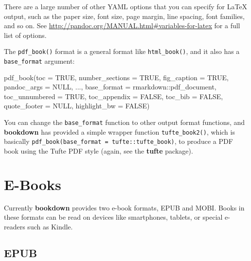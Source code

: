 \documentclass[
  12pt,
]{krantz}
\newenvironment{Shaded}{\begin{snugshade}}{\end{snugshade}}
\newcommand{\AttributeTok}[1]{\textcolor[rgb]{0.77,0.63,0.00}{#1}}
\newcommand{\ConstantTok}[1]{\textcolor[rgb]{0.00,0.00,0.00}{#1}}
\newcommand{\FunctionTok}[1]{\textcolor[rgb]{0.00,0.00,0.00}{#1}}
\newcommand{\NormalTok}[1]{#1}
\newcommand{\SpecialCharTok}[1]{\textcolor[rgb]{0.00,0.00,0.00}{#1}}
\theoremstyle{definition}
\theoremstyle{definition}
\theoremstyle{definition}
\theoremstyle{definition}
\theoremstyle{remark}
\begin{document}
There are a large number of other YAML options that you can specify for LaTeX output, such as the paper size, font size, page margin, line spacing, font families, and so on. See \url{http://pandoc.org/MANUAL.html\#variables-for-latex} for a full list of options.

The \texttt{pdf\_book()} format is a general format like \texttt{html\_book()}, and it also has a \texttt{base\_format} argument:

\begin{Shaded}
\begin{Highlighting}[]
\FunctionTok{pdf\_book}\NormalTok{(}\AttributeTok{toc =} \ConstantTok{TRUE}\NormalTok{, }\AttributeTok{number\_sections =} \ConstantTok{TRUE}\NormalTok{,}
  \AttributeTok{fig\_caption =} \ConstantTok{TRUE}\NormalTok{, }\AttributeTok{pandoc\_args =} \ConstantTok{NULL}\NormalTok{, ...,}
  \AttributeTok{base\_format =}\NormalTok{ rmarkdown}\SpecialCharTok{::}\NormalTok{pdf\_document,}
  \AttributeTok{toc\_unnumbered =} \ConstantTok{TRUE}\NormalTok{, }\AttributeTok{toc\_appendix =} \ConstantTok{FALSE}\NormalTok{,}
  \AttributeTok{toc\_bib =} \ConstantTok{FALSE}\NormalTok{, }\AttributeTok{quote\_footer =} \ConstantTok{NULL}\NormalTok{,}
  \AttributeTok{highlight\_bw =} \ConstantTok{FALSE}\NormalTok{)}
\end{Highlighting}
\end{Shaded}

You can change the \texttt{base\_format} function to other output format functions, and \textbf{bookdown} has provided a simple wrapper function \texttt{tufte\_book2()}, which is basically \texttt{pdf\_book(base\_format\ =\ tufte::tufte\_book)}, to produce a PDF book using the Tufte PDF style (again, see the \textbf{tufte} package).

\hypertarget{e-books}{%
\section{E-Books}\label{e-books}}

Currently \textbf{bookdown} provides two e-book formats, EPUB and MOBI. Books in these formats can be read on devices like smartphones, tablets, or special e-readers such as Kindle.

\hypertarget{epub}{%
\subsection{EPUB}\label{epub}}
\end{document}
